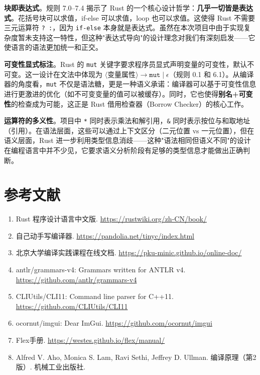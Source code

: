 \documentclass[12pt,a4paper]{ctexart}
\begin{document}
\textbf{块即表达式}。规则 7.0--7.4 揭示了 Rust 的一个核心设计哲学：\textbf{几乎一切皆是表达式}。花括号块可以求值，if-else 可以求值，loop 也可以求值。这使得 Rust 不需要三元运算符 \texttt{? :}，因为 \texttt{if-else} 本身就是表达式。虽然在本次项目中由于实现复杂度暂未支持这一特性，但这种"表达式导向"的设计理念对我们有深刻启发——它使语言的语法更加统一和正交。

\textbf{可变性显式标注}。Rust 的 \texttt{mut} 关键字要求程序员显式声明变量的可变性，默认不可变。这一设计在文法中体现为 $\langle\text{变量属性}\rangle \rightarrow \texttt{mut} \mid \epsilon$（规则 0.1 和 6.1）。从编译器的角度看，\texttt{mut} 不仅是语法糖，更是一种语义承诺：编译器可以基于可变性信息进行更激进的优化（如不可变变量的值可以被缓存）。同时，它也使得\textbf{别名+可变性}的检查成为可能，这正是 Rust 借用检查器（Borrow Checker）的核心工作。

\textbf{运算符的多义性}。项目中 \texttt{*} 同时表示乘法和解引用，\texttt{\&} 同时表示按位与和取地址（引用）。在语法层面，这些可以通过上下文区分（二元位置 vs 一元位置），但在语义层面，Rust 进一步利用类型信息消歧——这种"语法相同但语义不同"的设计在编程语言中并不少见，它要求语义分析阶段有足够的类型信息才能做出正确判断。

\newpage

\section{参考文献}

\begin{enumerate}
    \item Rust 程序设计语言中文版. \url{https://rustwiki.org/zh-CN/book/}
    \item 自己动手写编译器. \url{https://pandolia.net/tinyc/index.html}
    \item 北京大学编译实践课程在线文档. \url{https://pku-minic.github.io/online-doc/}
    \item antlr/grammars-v4: Grammars written for ANTLR v4. \url{https://github.com/antlr/grammars-v4}
    \item CLIUtils/CLI11: Command line parser for C++11. \url{https://github.com/CLIUtils/CLI11}
    \item ocornut/imgui: Dear ImGui. \url{https://github.com/ocornut/imgui}
    \item Flex手册. \url{https://westes.github.io/flex/manual/}
    \item Alfred V. Aho, Monica S. Lam, Ravi Sethi, Jeffrey D. Ullman. 编译原理（第2版）. 机械工业出版社.
\end{enumerate}
\end{document}
